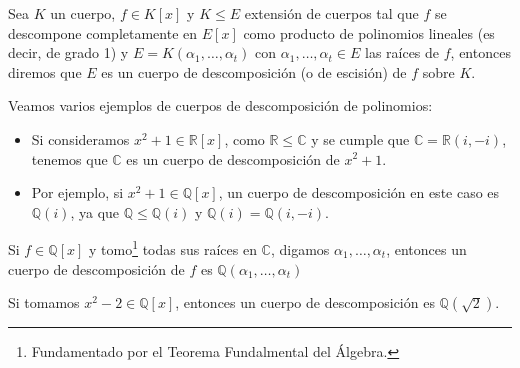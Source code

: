\begin{definicion}
    Sea $K$ un cuerpo, $f\in K[x]$ y $K\leq E$ extensión de cuerpos tal que $f$ se descompone completamente en $E[x]$ como producto de polinomios lineales (es decir, de grado 1) y $E=K(\alpha_1,\ldots,\alpha_t)$ con $\alpha_1,\ldots,\alpha_t\in E$ las raíces de $f$, entonces diremos que $E$ es un cuerpo de descomposición (o de escisión) de $f$ sobre $K$.
\end{definicion}


\begin{ejemplo}
    Veamos varios ejemplos de cuerpos de descomposición de polinomios:
    \begin{itemize}
        \item Si consideramos $x^2+1\in \mathbb{R}[x]$, como $\mathbb{R}\leq \mathbb{C}$ y se cumple que $\mathbb{C} = \mathbb{R}(i,-i)$, tenemos que $\mathbb{C}$ es un cuerpo de descomposición de $x^2+1$.
        \item Por ejemplo, si $x^2+1\in \mathbb{Q}[x]$, un cuerpo de descomposición en este caso es $\mathbb{Q}(i)$, ya que $\mathbb{Q}\leq \mathbb{Q}(i)$ y $\mathbb{Q}(i) = \mathbb{Q}(i,-i)$.
    \end{itemize}
\end{ejemplo}

\begin{observacion}
    Si $f\in \mathbb{Q}[x]$ y tomo\footnote{Fundamentado por el Teorema Fundalmental del Álgebra.} todas sus raíces en $\mathbb{C}$, digamos $\alpha_1,\ldots,\alpha_t$, entonces un cuerpo de descomposición de $f$ es $\mathbb{Q}(\alpha_1,\ldots,\alpha_t)$
\end{observacion}

\begin{ejemplo}
    Si tomamos $x^2-2\in \mathbb{Q}[x]$, entonces un cuerpo de descomposición es $\mathbb{Q}(\sqrt{2})$.
\end{ejemplo}

